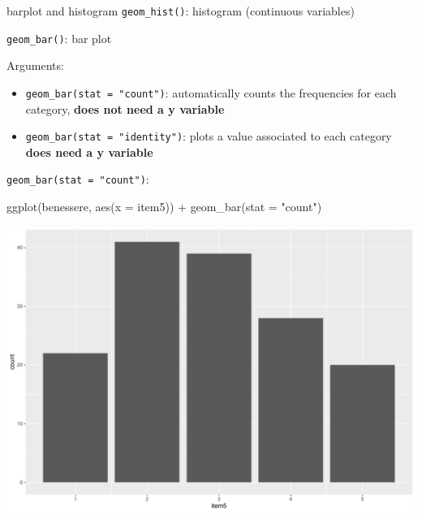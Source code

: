 \documentclass[
  ignorenonframetext,
]{beamer}
\newenvironment{Shaded}{\begin{snugshade}}{\end{snugshade}}
\newcommand{\AttributeTok}[1]{\textcolor[rgb]{0.00,0.34,0.68}{#1}}
\newcommand{\FunctionTok}[1]{\textcolor[rgb]{0.39,0.29,0.61}{#1}}
\newcommand{\NormalTok}[1]{\textcolor[rgb]{0.12,0.11,0.11}{#1}}
\newcommand{\SpecialCharTok}[1]{\textcolor[rgb]{0.24,0.68,0.91}{#1}}
\newcommand{\StringTok}[1]{\textcolor[rgb]{0.75,0.01,0.01}{#1}}
\begin{document}
\begin{frame}[fragile]{barplot and histogram}
\protect\hypertarget{barplot-and-histogram}{}
\texttt{geom\_hist()}: histogram (continuous variables)

\texttt{geom\_bar()}: bar plot

Arguments:

\begin{itemize}
\item
  \texttt{geom\_bar(stat\ =\ "count")}: automatically counts the
  frequencies for each category, \textbf{does not need a y variable}
\item
  \texttt{geom\_bar(stat\ =\ "identity")}: plots a value associated to
  each category \textbf{does need a y variable}
\end{itemize}
\end{frame}

\begin{frame}[fragile]{\texttt{geom\_bar(stat\ =\ "count")}:}
\protect\hypertarget{geom_barstat-count}{}
\begin{Shaded}
\begin{Highlighting}[]
\FunctionTok{ggplot}\NormalTok{(benessere, }
       \FunctionTok{aes}\NormalTok{(}\AttributeTok{x =}\NormalTok{ item5)) }\SpecialCharTok{+} \FunctionTok{geom\_bar}\NormalTok{(}\AttributeTok{stat =} \StringTok{"count"}\NormalTok{)}
\end{Highlighting}
\end{Shaded}

\begin{center}\includegraphics[width=0.7\linewidth]{Practice_files/figure-beamer/unnamed-chunk-79-1} \end{center}
\end{frame}
\end{document}
